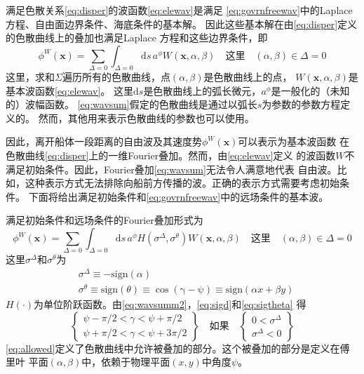 满足色散关系\eqref{eq:disper}的波函数\eqref{eq:elewav}是满足
\eqref{eq:govrnfreewav}中的Laplace方程、自由面边界条件、海底条件的基本解。
因此这些基本解在由\eqref{eq:disper}定义的色散曲线上的叠加也满足Laplace
方程和这些边界条件，即
\begin{equation}
  \phi^W(\mathbf{x})=\sum_{\Delta=0}\int_{\Delta=0}\mathrm{d}s\,a^\phi
  W(\mathbf{x},\alpha,\beta)\quad\text{这里}\quad (\alpha,\beta)\in\Delta=0
  \label{eq:wavsum}
\end{equation}
这里，求和$\Sigma$遍历所有的色散曲线，点$(\alpha,\beta)$是色散曲线上的点，
$W(\mathbf{x},\alpha,\beta)$是基本波函数\eqref{eq:elewav}。
这里$\mathrm{d}s$是色散曲线上的弧长微元，$a^\phi$是一般化的（未知的）波幅函数。
\eqref{eq:wavsum}假定的色散曲线是通过以弧长$s$为参数的参数方程定义的。
然而，其他用来表示色散曲线的参数也可以使用。

因此，离开船体一段距离的自由波及其速度势$\phi^W(\mathbf{x})$可以表示为基本波函数
在色散曲线\eqref{eq:disper}上的一维Fourier叠加。然而，由\eqref{eq:elewav}定义
的波函数$W$不满足初始条件。因此，Fourier叠加\eqref{eq:wavsum}无法令人满意地代表
自由波。比如，这种表示方式无法排除向船前方传播的波。正确的表示方式需要考虑初始条件。
下面将给出满足初始条件和\eqref{eq:govrnfreewav}中的远场条件的基本波。

满足初始条件和远场条件的Fourier叠加形式为
\begin{equation}
  \phi^W(\mathbf{x})=\sum_{\Delta=0}\int_{\Delta=0}\mathrm{d}s\,a^\phi
  H(\sigma^\Delta,\sigma^\theta)
  W(\mathbf{x},\alpha,\beta)\quad\text{这里}\quad (\alpha,\beta)\in\Delta=0
  \label{eq:wavsumm2}
\end{equation}
这里$\sigma^\Delta$和$\sigma^\theta$为
\begin{eqnarray}
  &\sigma^\Delta\equiv-\mathrm{sign}(\alpha)\label{eq:sigd}\\
  &\sigma^\theta\equiv\mathrm{sign}(\theta)\equiv\mathrm{\cos(\gamma-\psi)}
  \equiv\mathrm{sign}(\alpha x+\beta y) \label{eq:sigtheta}
\end{eqnarray}
$H(\cdot)$为单位阶跃函数。由\eqref{eq:wavsumm2}，\eqref{eq:sigd}和\eqref{eq:sigtheta}
得
\begin{equation}
  \left\{
    \begin{array}{l}
      \psi-\pi/2<\gamma<\psi+\pi/2\\
      \psi+\pi/2<\gamma<\psi+3\pi/2
    \end{array}
  \right\}
  \quad\text{如果}\quad
  \left\{
    \begin{array}{l}
      0<\sigma^\Delta\\
      \sigma^\Delta<0
    \end{array}
  \right\}
  \label{eq:allowed}
\end{equation}
\eqref{eq:allowed}定义了色散曲线中允许被叠加的部分。这个被叠加的部分是定义在傅里叶
平面$(\alpha,\beta)$中，依赖于物理平面$(x,y)$中角度$\psi$。

